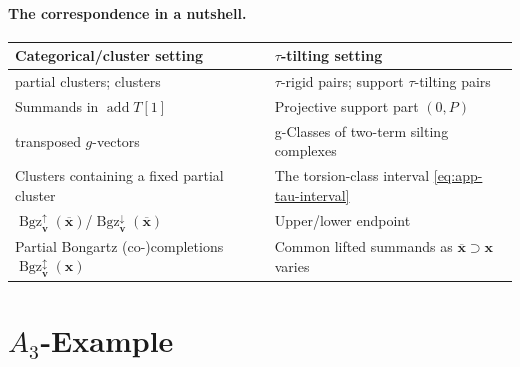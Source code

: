 \documentclass[11pt,reqno]{amsart}
\theoremstyle{plain}
\theoremstyle{definition}
\numberwithin{equation}{section}
\newcommand\<{\langle}
\renewcommand\>{\rangle}
\newcommand\Add{\operatorname{add}}
\def\vv{\mathbf{v}}
\def\xx{\mathbf{x}}%
\newcommand{\Bgzp}[2]{\operatorname{Bgz}^{\uparrow}_{#2}(#1)}
\newcommand{\Bgzm}[2]{\operatorname{Bgz}^{\downarrow}_{#2}(#1)}
\newcommand{\Bgzpm}[2]{\operatorname{Bgz}^{\updownarrow}_{#2}(#1)}
\newcommand{\ol}[1]{\overline{#1}}
\begin{document}
\paragraph{The correspondence in a nutshell.}
\begin{center}
\small
\renewcommand{\arraystretch}{1.15}
\begin{tabular}{@{}p{.45\linewidth}p{.49\linewidth}@{}}
\hline
Categorical/cluster setting & $\tau$-tilting setting\\
\hline
partial clusters; clusters 
 & $\tau$-rigid pairs; support $\tau$-tilting pairs\\
Summands in $\Add T[1]$
 & Projective support part $(0,P)$\\
transposed $g$-vectors
 & g-Classes of two-term silting complexes\\
Clusters containing a fixed partial cluster
 & The torsion-class interval \eqref{eq:app-tau-interval}\\
$\Bgzp{\ol{\xx}}{\vv}$/$\Bgzm{\ol{\xx}}{\vv}$
 & Upper/lower endpoint\\
Partial Bongartz (co-)completions $\Bgzpm{\xx}{\vv}$
 & Common lifted summands as $\ol{\xx}\supset\xx$ varies\\
\hline
\end{tabular}
\end{center}


\section{\texorpdfstring{$A_3$-Example}{A3-Example}}
\end{document}
